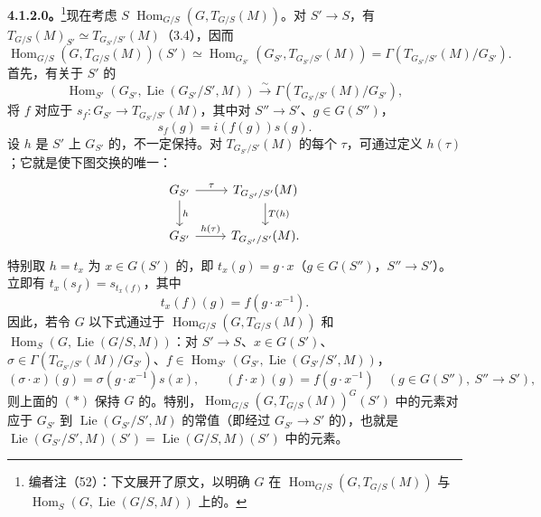 \textbf{4.1.2.0。}\footnote{编者注（52）：下文展开了原文，以明确 $G$ 在 $\operatorname{Hom}_{G/S}(G,T_{G/S}(M))$ 与 $\operatorname{Hom}_S(G,\operatorname{Lie}(G/S,M))$ 上的。}现在考虑 $S$  $\operatorname{Hom}_{G/S}(G,T_{G/S}(M))$。对 $S'\to S$，有 $T_{G/S}(M)_{S'}\simeq T_{G_{S'}/S'}(M)$（3.4），因而
\[\operatorname{Hom}_{G/S}(G,T_{G/S}(M))(S')\simeq\operatorname{Hom}_{G_{S'}}(G_{S'},T_{G_{S'}/S'}(M))=\Gamma(T_{G_{S'}/S'}(M)/G_{S'}).\]
首先，有关于 $S'$ 的
\[\operatorname{Hom}_{S'}(G_{S'},\operatorname{Lie}(G_{S'}/S',M))\xrightarrow{\sim}\Gamma(T_{G_{S'}/S'}(M)/G_{S'}),\tag{*}\]
将 $f$ 对应于 $s_f:G_{S'}\to T_{G_{S'}/S'}(M)$，其中对 $S''\to S'$、$g\in G(S'')$，
\[s_f(g)=i(f(g))s(g).\]
设 $h$ 是 $S'$ 上 $G_{S'}$ 的，不一定保持。对 $T_{G_{S'}/S'}(M)$ 的每个 $\tau$，可通过定义 $h(\tau)$；它就是使下图交换的唯一：
\[\begin{tikzcd}
G_{S'}\arrow[r,"\tau"]\arrow[d,"h"]&T_{G_{S'}/S'}(M)\arrow[d,"T(h)"]\\
G_{S'}\arrow[r,"h(\tau)"]&T_{G_{S'}/S'}(M).
\end{tikzcd}\]
特别取 $h=t_x$ 为 $x\in G(S')$ 的，即 $t_x(g)=g\cdot x$（$g\in G(S'')$，$S''\to S'$）。立即有 $t_x(s_f)=s_{t_x(f)}$，其中
\[t_x(f)(g)=f(g\cdot x^{-1}).\]
因此，若令 $G$ 以下式通过于
$\operatorname{Hom}_{G/S}(G,T_{G/S}(M))$ 和 $\operatorname{Hom}_S(G,\operatorname{Lie}(G/S,M))$：对 $S'\to S$、$x\in G(S')$、$\sigma\in\Gamma(T_{G_{S'}/S'}(M)/G_{S'})$、$f\in\operatorname{Hom}_{S'}(G_{S'},\operatorname{Lie}(G_{S'}/S',M))$，
\[(\sigma\cdot x)(g)=\sigma(g\cdot x^{-1})s(x),\qquad(f\cdot x)(g)=f(g\cdot x^{-1})\quad(g\in G(S''),\ S''\to S'),\]
则上面的 $(*)$ 保持 $G$ 的。特别，$\operatorname{Hom}_{G/S}(G,T_{G/S}(M))^G(S')$ 中的元素对应于 $G_{S'}$ 到 $\operatorname{Lie}(G_{S'}/S',M)$ 的常值（即经过 $G_{S'}\to S'$ 的），也就是 $\operatorname{Lie}(G_{S'}/S',M)(S')=\operatorname{Lie}(G/S,M)(S')$ 中的元素。

